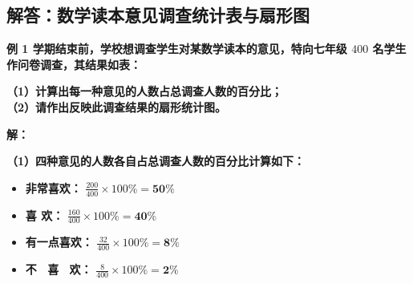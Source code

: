 \newpage

\newpage

\subsection{解答：数学读本意见调查统计表与扇形图}

\vspace{0.6cm}

\textbf{例 1 \quad 学期结束前，学校想调查学生对某数学读本的意见，特向七年级 $400$ 名学生作问卷调查，其结果如表：}

\vspace{0.2cm}
\begin{center}
\renewcommand{\arraystretch}{1.6}
\end{center}

\vspace{0.4cm}

\textbf{（1）计算出每一种意见的人数占总调查人数的百分比；} \\
\textbf{（2）请作出反映此调查结果的扇形统计图。}

\vspace{0.4cm}
\textbf{解：}

\textbf{（1）四种意见的人数各自占总调查人数的百分比计算如下：}
\begin{itemize}
    \item \textbf{非常喜欢：} $\displaystyle \frac{200}{400} \times 100\% = \boldsymbol{50\%}$
    \vspace{0.1cm}
    \item \textbf{喜 \qquad 欢：} $\displaystyle \frac{160}{400} \times 100\% = \boldsymbol{40\%}$
    \vspace{0.1cm}
    \item \textbf{有一点喜欢：} $\displaystyle \frac{32}{400} \times 100\% = \boldsymbol{8\%}$
    \vspace{0.1cm}
    \item \textbf{不 \ 喜 \ 欢：} $\displaystyle \frac{8}{400} \times 100\% = \boldsymbol{2\%}$
\end{itemize}

